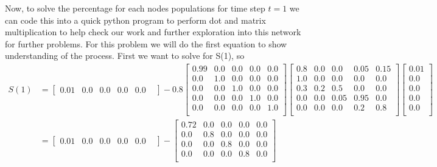 \documentclass[11pt]{article}
\begin{document}
{\begin{enumerate}
\begin{center}
\end{center}
Now, to solve the percentage for each nodes populations for time step $t=1$ we can code this into a quick python program to perform dot and matrix multiplication to help check our work and further exploration into this network for further problems.  For this problem we will do the first equation to show understanding of the process.  First we want to solve for S(1), so\\
\begin{align*}
	S(1) &=
		\begin{bmatrix} 
		0.01 &
		0.0 	&
		0.0 	&
		0.0 	&
		0.0 	&
		\end{bmatrix}
		 - 0.8 
		\begin{bmatrix} 
		0.99  & 0.0 & 0.0 & 0.0 & 0.0 \\
		0.0  & 1.0 & 0.0 & 0.0   & 0.0 \\
		0.0  & 0.0 & 1.0 & 0.0 & 0.0 \\
		0.0  & 0 .0 & 0.0 & 1.0 & 0.0 \\
		0.0  & 0 .0 & 0.0 & 0.0 & 1.0 \\
		\end{bmatrix}
		\begin{bmatrix} 
		0.8  & 0.0 & 0.0 & 0.05 & 0.15 \\
		1.0  & 0.0 & 0.0 & 0.0   & 0.0 \\
		0.3  & 0.2 & 0.5 & 0.0 & 0.0 \\
		0.0  & 0 .0 & 0.05 & 0.95 & 0.0 \\
		0.0  & 0 .0 & 0.0 & 0.2 & 0.8 \\
		\end{bmatrix}
		\begin{bmatrix} 
		0.01 \\
		0.0 	\\
		0.0 	\\
		0.0 	\\
		0.0 	\\
		\end{bmatrix}\\
&=
		\begin{bmatrix} 
		0.01 &
		0.0 	&
		0.0 	&
		0.0 	&
		0.0 	&
		\end{bmatrix}
		 - 
		\begin{bmatrix} 
		0.72  & 0.0 & 0.0 & 0.0 & 0.0 \\
		0.0  & 0.8 & 0.0 & 0.0   & 0.0 \\
		0.0  & 0.0 & 0.8 & 0.0 & 0.0 \\
		0.0  & 0 .0 & 0.0 & 0.8 & 0.0 \\

\end{bmatrix}
\end{align*}
\end{enumerate}}
\end{document}
